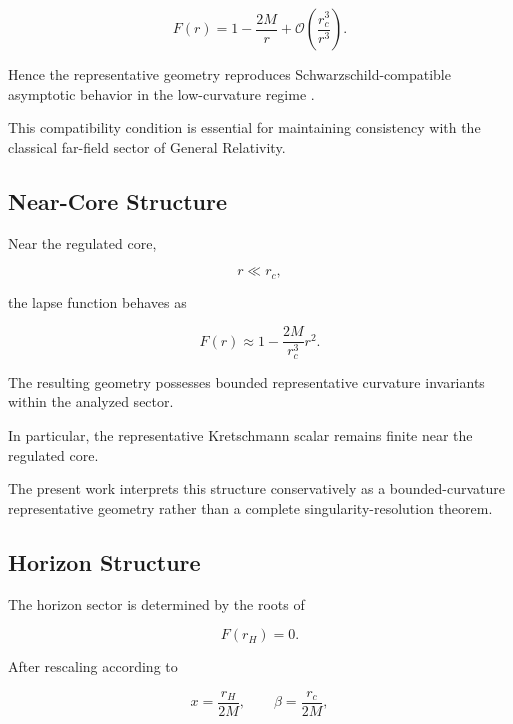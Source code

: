 \begin{equation}
F(r)
=
1
-
\frac{2M}{r}
+
\mathcal{O}\!\left(\frac{r_c^3}{r^3}\right).
\end{equation}

Hence the representative geometry reproduces Schwarzschild-compatible asymptotic behavior in the low-curvature regime \cite{wald1984,chandrasekhar1983}.

This compatibility condition is essential for maintaining consistency with the classical far-field sector of General Relativity.


\subsection{Near-Core Structure}

Near the regulated core,

\begin{equation}
r \ll r_c,
\end{equation}

the lapse function behaves as

\begin{equation}
F(r)
\approx
1
-
\frac{2M}{r_c^3}r^2.
\end{equation}

The resulting geometry possesses bounded representative curvature invariants within the analyzed sector.

In particular, the representative Kretschmann scalar remains finite near the regulated core.

The present work interprets this structure conservatively as a bounded-curvature representative geometry rather than a complete singularity-resolution theorem.


\subsection{Horizon Structure}

The horizon sector is determined by the roots of

\begin{equation}
F(r_H)=0.
\end{equation}

After rescaling according to

\begin{equation}
x
=
\frac{r_H}{2M},
\qquad
\beta
=
\frac{r_c}{2M},
\end{equation}

